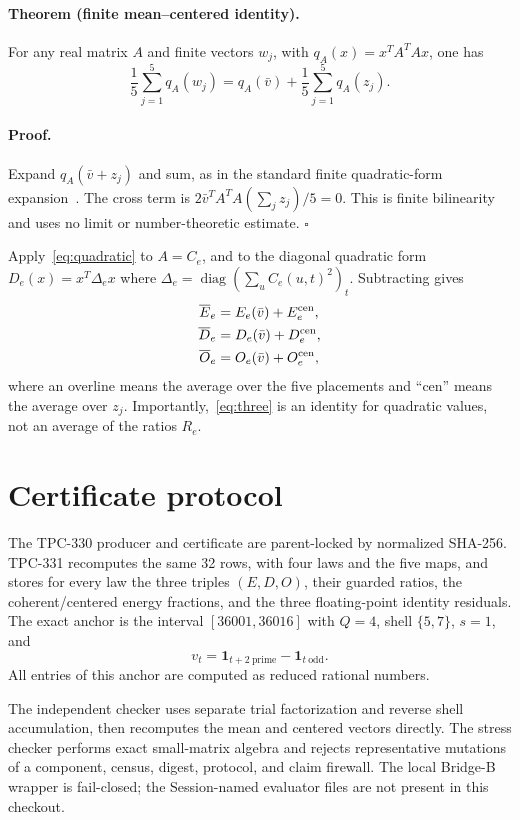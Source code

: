 \documentclass[10pt]{article}
\newcommand{\ind}{\mathbf 1}
\begin{document}
\paragraph{Theorem (finite mean--centered identity).}
For any real matrix $A$ and finite vectors $w_j$, with
$q_A(x)=x^TA^TAx$, one has
\begin{equation}\label{eq:quadratic}
 \frac15\sum_{j=1}^5q_A(w_j)=q_A(\bar v)+
 \frac15\sum_{j=1}^5q_A(z_j).
\end{equation}

\paragraph{Proof.}
Expand $q_A(\bar v+z_j)$ and sum, as in the standard finite quadratic-form
expansion~\cite{horn2013matrix}.  The cross term is
$2\bar v^TA^TA(\sum_jz_j)/5=0$.  This is finite bilinearity and uses no
limit or number-theoretic estimate. \hfill$\square$

Apply~\eqref{eq:quadratic} to $A=C_e$, and to the diagonal quadratic form
$D_e(x)=x^T\Delta_ex$ where
$\Delta_e=\operatorname{diag}(\sum_uC_e(u,t)^2)_t$.  Subtracting gives
\begin{align}
 \overline E_e&=E_e(\bar v)+E_e^{\rm cen},\\
 \overline D_e&=D_e(\bar v)+D_e^{\rm cen},\\
 \overline O_e&=O_e(\bar v)+O_e^{\rm cen},
 \label{eq:three}
\end{align}
where an overline means the average over the five placements and ``cen''
means the average over $z_j$.  Importantly,~\eqref{eq:three} is an identity
for quadratic values, not an average of the ratios $R_e$.

\section{Certificate protocol}

The TPC-330 producer and certificate are parent-locked by normalized SHA-256.
TPC-331 recomputes the same 32 rows, with four laws and the five maps, and
stores for every law the three triples $(E,D,O)$, their guarded ratios, the
coherent/centered energy fractions, and the three floating-point identity
residuals.  The exact anchor is the interval $[36001,36016]$ with $Q=4$,
shell $\{5,7\}$, $s=1$, and
\[
 v_t=\ind_{t+2\ \mathrm{prime}}-\ind_{t\ \mathrm{odd}}.
\]
All entries of this anchor are computed as reduced rational numbers.

The independent checker uses separate trial factorization and reverse shell
accumulation, then recomputes the mean and centered vectors directly.  The
stress checker performs exact small-matrix algebra and rejects representative
mutations of a component, census, digest, protocol, and claim firewall.  The
local Bridge-B wrapper is fail-closed; the Session-named evaluator files are
not present in this checkout.
\end{document}
